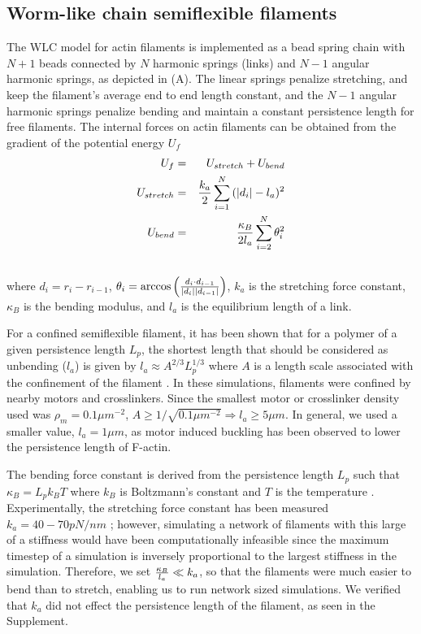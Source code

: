 \documentclass[12pt]{article}
\begin{document}
\subsection{Worm-like chain semiflexible filaments}
The WLC model for actin filaments is implemented as a bead spring chain with $N+1$ beads connected by $N$ harmonic
springs (links) and $N-1$ angular harmonic springs, as depicted in (A). The linear springs 
penalize stretching, and keep the filament's average end to end length constant, and the $N-1$ angular harmonic springs
penalize bending and maintain a constant persistence length for free filaments. 
The internal forces on actin filaments can be obtained from the gradient of the potential energy $U_f$
\begin{eqnarray}
  U_f &=& U_{stretch} + U_{bend}\\
  U_{stretch}&=&{k_a\over2}\sum_{i=1}^{N}{(|d_i| - l_a)^2}\\\nonumber
  U_{bend}&=&{\kappa_B\over 2l_a}\sum_{i=2}^N{\theta_i^2}\\\nonumber
  \label{eqn:Ufil}
\end{eqnarray}
where $d_i = r_i-r_{i-1}$, $\theta_i = \arccos{\left({d_i\cdot d_{i-1}\over |d_i||d_{i-1}|}\right)}$, $k_a$ is the
stretching force constant, $\kappa_B$ is the bending modulus, and $l_a$ is the equilibrium length of a
link. 
\par
For a confined semiflexible filament, it has been shown that for a polymer of a
given persistence length $L_p$, the shortest length that should be considered as
unbending ($l_a$) is given by $l_a\approx A^{2/3}L_p^{1/3}$ where $A$ is a
length scale associated with the confinement of the
filament \cite{odijk1983}. In these simulations, filaments were confined by
nearby motors and crosslinkers. Since the smallest motor or crosslinker density
used was $\rho_m=0.1\mu m^{-2}$, $A\ge1/\sqrt{0.1\mu m^{-2}}\Rightarrow l_a\ge5\mu m$.
In general, we used a smaller value, $l_a=1\mu m$, as motor induced buckling has been
observed to lower the persistence length of F-actin. 
\par
The bending force constant is derived from the persistence length $L_p$ such that
$\kappa_B = L_p k_B T$ where $k_B$ is Boltzmann's constant and $T$ is the temperature \cite{rubinstein}.
Experimentally, the stretching force constant has been measured $k_a=40-70pN/nm$ \cite{kojima1994, higuchi1995};
however, simulating a network of filaments with this large of a stiffness would
have been computationally infeasible since the maximum timestep of a simulation is inversely
proportional to the largest stiffness in the simulation\cite{leimkuhler2015}. Therefore, we set
${\kappa_B\over l_a} \ll k_a$, so that the filaments
were much easier to bend than to stretch, enabling us to run network sized 
simulations. We verified that $k_a$ did not effect the persistence length of the
filament, as seen in the Supplement.
\end{document}
